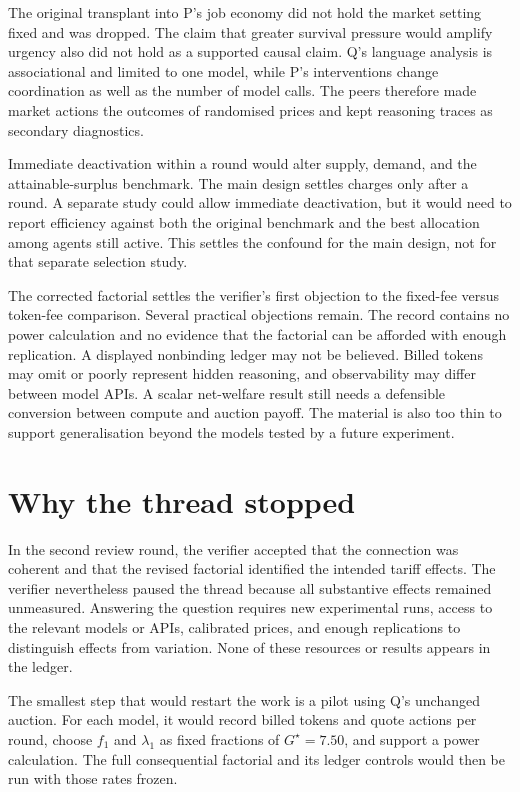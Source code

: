 \documentclass{article}
\begin{document}
The original transplant into P's job economy did not hold the market setting fixed and was dropped.  The claim that greater survival pressure would amplify urgency also did not hold as a supported causal claim.  Q's language analysis is associational and limited to one model, while P's interventions change coordination as well as the number of model calls.  The peers therefore made market actions the outcomes of randomised prices and kept reasoning traces as secondary diagnostics.

Immediate deactivation within a round would alter supply, demand, and the attainable-surplus benchmark.  The main design settles charges only after a round.  A separate study could allow immediate deactivation, but it would need to report efficiency against both the original benchmark and the best allocation among agents still active.  This settles the confound for the main design, not for that separate selection study.

The corrected factorial settles the verifier's first objection to the fixed-fee versus token-fee comparison.  Several practical objections remain.  The record contains no power calculation and no evidence that the factorial can be afforded with enough replication.  A displayed nonbinding ledger may not be believed.  Billed tokens may omit or poorly represent hidden reasoning, and observability may differ between model APIs.  A scalar net-welfare result still needs a defensible conversion between compute and auction payoff.  The material is also too thin to support generalisation beyond the models tested by a future experiment.

\section{Why the thread stopped}

In the second review round, the verifier accepted that the connection was coherent and that the revised factorial identified the intended tariff effects.  The verifier nevertheless paused the thread because all substantive effects remained unmeasured.  Answering the question requires new experimental runs, access to the relevant models or APIs, calibrated prices, and enough replications to distinguish effects from variation.  None of these resources or results appears in the ledger.

The smallest step that would restart the work is a pilot using Q's unchanged auction.  For each model, it would record billed tokens and quote actions per round, choose \(f_1\) and \(\lambda_1\) as fixed fractions of \(G^{\star}=7.50\), and support a power calculation.  The full consequential factorial and its ledger controls would then be run with those rates frozen.



\end{document}
